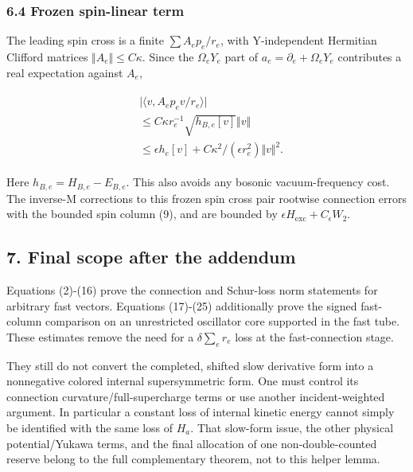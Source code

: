 \subsubsection{6.4 Frozen spin-linear
term}\label{e-frozen-spin-linear-term}

The leading spin cross is a finite \(\sum  A_{e} p_{e}/r_{e}\), with
Y-independent Hermitian Clifford matrices
\(\Vert A_{e}\Vert \le C \kappa\). Since the \(\Omega _{e} Y_{e}\) part
of \(a_{e}=\partial _{e}+\Omega _{e} Y_{e}\) contributes a real
expectation against \(A_{e}\),

\begin{gather*}
\begin{aligned}
& \vert \langle v,A_{e} p_{e} v/r_{e}\rangle \vert \\
& \le  C \kappa  r_{e}^{-1} \sqrt{h_{B,e}[v]} \Vert v\Vert \\
& \le  \epsilon  h_{e}[v]+C \kappa ^{2}/(\epsilon  r_{e}^{2})\Vert v\Vert ^{2}.
\end{aligned}\tag{25}
\end{gather*}

Here \(h_{B,e}=H_{B,e}-E_{B,e}\). This also avoids any bosonic
vacuum-frequency cost. The inverse-M corrections to this frozen spin
cross pair rootwise connection errors with the bounded spin column (9),
and are bounded by \(\epsilon  H_{\mathrm{exc}}+C_{\epsilon} W_{2}\).

\subsection{7. Final scope after the
addendum}\label{e-final-scope-after-the-addendum}

Equations (2)-(16) prove the connection and Schur-loss norm statements
for arbitrary fast vectors. Equations (17)-(25) additionally prove the
signed fast-column comparison on an unrestricted oscillator core
supported in the fast tube. These estimates remove the need for a
\(\delta  \sum _{e} r_{e}\) loss at the fast-connection stage.

They still do not convert the completed, shifted slow derivative form
into a nonnegative colored internal supersymmetric form. One must
control its connection curvature/full-supercharge terms or use another
incident-weighted argument. In particular a constant loss of internal
kinetic energy cannot simply be identified with the same loss of
\(H_{a}\). That slow-form issue, the other physical potential/Yukawa
terms, and the final allocation of one non-double-counted reserve belong
to the full complementary theorem, not to this helper lemma.
